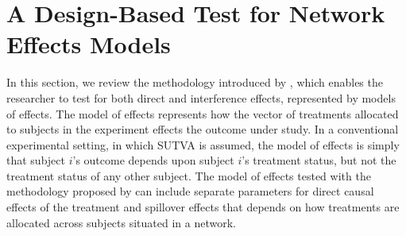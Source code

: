 \documentclass[12pt]{article}
\begin{document}


\section{A Design-Based Test for Network Effects Models}

In this section, we review the methodology introduced by \citet{bowers2012reasoning}, which enables the researcher to test for both direct and interference effects, represented by models of effects. The model of effects represents how the vector of treatments allocated to subjects in the experiment effects the outcome under study. In a conventional experimental setting, in which SUTVA is assumed, the model of effects is simply that subject $i$'s outcome depends upon subject $i$'s treatment status, but not the treatment status of any other subject. The model of effects tested with the methodology proposed by  \citet{bowers2012reasoning} can  include separate parameters for direct causal effects of the treatment and spillover effects that depends on how treatments are allocated across subjects situated in a network. 

\end{document}
